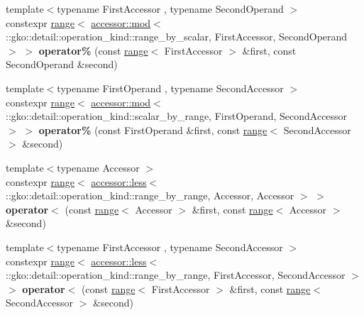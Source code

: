 \begin{DoxyCompactItemize}
\item 
\mbox{\label{namespacegko_a175e929e92316d5352207795a0da2a82}} 
{\footnotesize template$<$typename First\+Accessor , typename Second\+Operand $>$ }\\constexpr \hyperlink{classgko_1_1range}{range}$<$ \hyperlink{structgko_1_1accessor_1_1mod}{accessor\+::mod}$<$ \+::gko\+::detail\+::operation\+\_\+kind\+::range\+\_\+by\+\_\+scalar, First\+Accessor, Second\+Operand $>$ $>$ {\bfseries operator\%} (const \hyperlink{classgko_1_1range}{range}$<$ First\+Accessor $>$ \&first, const Second\+Operand \&second)
\item 
\mbox{\label{namespacegko_abe20522bc3e2a9e6f1069d783cad8e06}} 
{\footnotesize template$<$typename First\+Operand , typename Second\+Accessor $>$ }\\constexpr \hyperlink{classgko_1_1range}{range}$<$ \hyperlink{structgko_1_1accessor_1_1mod}{accessor\+::mod}$<$ \+::gko\+::detail\+::operation\+\_\+kind\+::scalar\+\_\+by\+\_\+range, First\+Operand, Second\+Accessor $>$ $>$ {\bfseries operator\%} (const First\+Operand \&first, const \hyperlink{classgko_1_1range}{range}$<$ Second\+Accessor $>$ \&second)
\item 
\mbox{\label{namespacegko_ab86394e93b6c232aae4816b59bdcca96}} 
{\footnotesize template$<$typename Accessor $>$ }\\constexpr \hyperlink{classgko_1_1range}{range}$<$ \hyperlink{structgko_1_1accessor_1_1less}{accessor\+::less}$<$ \+::gko\+::detail\+::operation\+\_\+kind\+::range\+\_\+by\+\_\+range, Accessor, Accessor $>$ $>$ {\bfseries operator$<$} (const \hyperlink{classgko_1_1range}{range}$<$ Accessor $>$ \&first, const \hyperlink{classgko_1_1range}{range}$<$ Accessor $>$ \&second)
\item 
\mbox{\label{namespacegko_ae8b90df104f6069d07d0d7a81a21d1de}} 
{\footnotesize template$<$typename First\+Accessor , typename Second\+Accessor $>$ }\\constexpr \hyperlink{classgko_1_1range}{range}$<$ \hyperlink{structgko_1_1accessor_1_1less}{accessor\+::less}$<$ \+::gko\+::detail\+::operation\+\_\+kind\+::range\+\_\+by\+\_\+range, First\+Accessor, Second\+Accessor $>$ $>$ {\bfseries operator$<$} (const \hyperlink{classgko_1_1range}{range}$<$ First\+Accessor $>$ \&first, const \hyperlink{classgko_1_1range}{range}$<$ Second\+Accessor $>$ \&second)

\end{DoxyCompactItemize}
